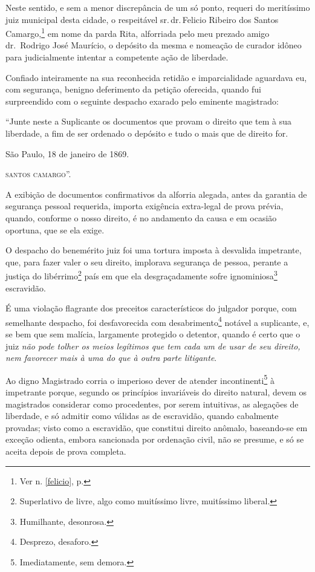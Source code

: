 Neste sentido, e sem a menor discrepância de um só ponto, requeri do
meritíssimo juiz municipal desta cidade, o respeitável sr.\,dr.\,Felicio
Ribeiro dos Santos Camargo,\footnote{Ver n. \ref{felicio}, p. \pageref{felicio}} 
em nome da parda Rita, alforriada pelo meu prezado amigo dr.~Rodrigo 
José Maurício, o depósito da mesma e nomeação de curador idôneo
para judicialmente intentar a competente ação de liberdade.

Confiado inteiramente na sua reconhecida retidão e imparcialidade
aguardava eu, com segurança, benigno deferimento da petição oferecida,
quando fui surpreendido com o seguinte despacho exarado pelo eminente
magistrado:

``Junte neste a Suplicante os documentos que provam o direito que
tem à sua liberdade, a fim de ser ordenado o depósito e tudo o mais que
de direito for.
\begin{flushright}
São Paulo, 18 de janeiro de 1869.

\textsc{santos camargo}''.
\end{flushright}
A exibição de documentos confirmativos da alforria alegada, antes da
garantia de segurança pessoal requerida, importa exigência extra-legal
de prova prévia, quando, conforme o nosso direito, é no andamento da
causa e em ocasião oportuna, que se ela exige.

O despacho do benemérito juiz foi uma tortura imposta à desvalida
impetrante, que, para fazer valer o seu direito, implorava segurança de
pessoa, perante a justiça do libérrimo\footnote{Superlativo de livre,
  algo como muitíssimo livre, muitíssimo liberal.} país em que ela
desgraçadamente sofre ignominiosa\footnote{Humilhante, desonrosa.}
escravidão.

É uma violação flagrante dos preceitos característicos do julgador
porque, com semelhante despacho, foi desfavorecida com
desabrimento\footnote{Desprezo, desaforo.} notável a suplicante, e, se
bem que sem malícia, largamente protegido o detentor, quando é certo que
o juiz \emph{não pode tolher os meios legítimos que tem cada um de usar
de seu direito, nem favorecer mais à uma do que à outra parte
litigante}.

Ao digno Magistrado corria o imperioso dever de atender
incontinenti\footnote{Imediatamente, sem demora.} à impetrante porque,
segundo os princípios invariáveis do direito natural, devem os
magistrados considerar como procedentes, por serem intuitivas, as
alegações de liberdade, e só admitir como válidas as de escravidão,
quando cabalmente provadas; visto como a escravidão, que constitui
direito anômalo, baseando-se em exceção odienta, embora sancionada por
ordenação civil, não se presume, e só se aceita depois de prova
completa.

